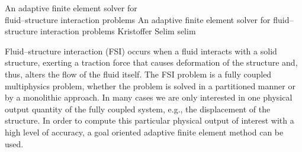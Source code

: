               {An adaptive finite element solver for \\ fluid--structure interaction problems}
              {An adaptive finite element solver for fluid--structure interaction problems}
              {Kristoffer Selim}
              {selim}


\newcommand{\subdt}{\textrm{d}_t}
\newcommand{\divv}{\textrm{div}\;}
\newcommand{\Divv}{\textrm{Div}\;}
\newcommand{\uF}{u_{_{F}}}
\newcommand{\dotuF}{\dot{u}_{_{F}}}
\newcommand{\pF}{p_{_{F}}}
\newcommand{\rhoF}{\rho_{_{F}}}
\newcommand{\sigmaF}{\sigma_{_{F}}}
\newcommand{\sigmaFup}{\sigma_{_{F}}(u_{_{F}}, p_{_{F}})}
\newcommand{\sigmaS}{\sigma_{_{S}}}
\newcommand{\bff}{b_{_{F}}}
\newcommand{\graduF}{\textrm{grad}\;u_{_{F}}}
\newcommand{\US}{U_{_{S}}}
\newcommand{\uS}{u_{_{S}}}
\newcommand{\GradUS}{\textrm{Grad}\;U_{_{S}}}
\newcommand{\ddotUS}{\ddot{U}_{_{S}}}
\newcommand{\ddotuS}{\ddot{u}_{_{S}}}
\newcommand{\PS}{P_{_{S}}}
\newcommand{\rhoS}{\rho_{_{S}}}
\newcommand{\SigmaS}{\Sigma_{_{S}}}
\newcommand{\SigmaSU}{\Sigma_{_{S}}(U_{_{S}})}
\newcommand{\BS}{B_{_{S}}}
\newcommand{\M}{\mathcal{M}}
\newcommand{\E}{\mathcal{E}}
\newcommand{\oF}{\omega_{_{F}}}
\newcommand{\oS}{\omega_{_{S}}}
\newcommand{\OS}{\Omega_{_{S}}}
\newcommand{\OF}{\Omega_{_{F}}}
\newcommand{\PhiS}{\Phi_{_{S}}}
\newcommand{\PhiM}{\Phi_{_{M}}}
\newcommand{\FS}{F_{_{S}}}
\newcommand{\UM}{U_{_{M}}}
\newcommand{\SigmaM}{\Sigma_{_{M}}}
\newcommand{\GradUM}{\textrm{Grad}\;U_{_{M}}}
\newcommand{\UF}{U_{_{F}}}
\newcommand{\PF}{P_{_{F}}}
\newcommand{\AFF}{A_{_{FF}}}
\newcommand{\AFS}{A_{_{FS}}}
\newcommand{\AFM}{A_{_{FM}}}
\newcommand{\ASS}{A_{_{SS}}}
\newcommand{\ASF}{A_{_{SF}}}
\newcommand{\ASM}{A_{_{SM}}}
\newcommand{\AMM}{A_{_{MM}}}
\newcommand{\AMF}{A_{_{MF}}}
\newcommand{\AMS}{A_{_{MS}}}

Fluid--structure interaction (FSI) occurs when a fluid interacts with
a solid structure, exerting a traction force that causes deformation
of the structure and, thus, alters the flow of the fluid itself.  The
FSI problem is a fully coupled multiphysics problem, whether the
problem is solved in a partitioned manner or by a monolithic
approach. In many cases we are only interested in one
physical output quantity of the fully coupled system, e.g., the
displacement of the structure. In order to compute this particular
physical output of interest with a high level of accuracy, a goal
oriented adaptive finite element method can be used.

